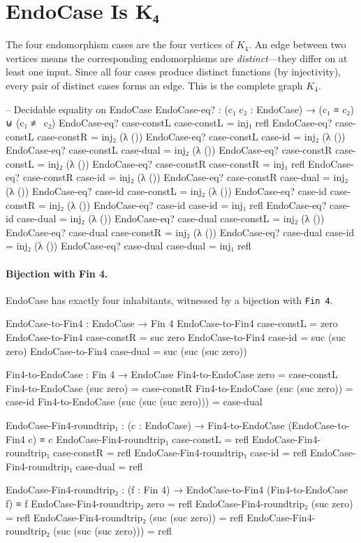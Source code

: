 \documentclass[11pt,a4paper]{book}
\begin{document}
\section{EndoCase Is K₄}
\label{sec:endocase-is-k4}

The four endomorphism cases are the four vertices of $K_4$. An edge between two
vertices means the corresponding endomorphisms are \emph{distinct}---they differ on
at least one input. Since all four cases produce distinct functions (by injectivity),
every pair of distinct cases forms an edge. This is the complete graph $K_4$.

\begin{code}
-- Decidable equality on EndoCase
EndoCase-eq? : (c₁ c₂ : EndoCase) → (c₁ ≡ c₂) ⊎ (c₁ ≢ c₂)
EndoCase-eq? case-constL case-constL = inj₁ refl
EndoCase-eq? case-constL case-constR = inj₂ (λ ())
EndoCase-eq? case-constL case-id     = inj₂ (λ ())
EndoCase-eq? case-constL case-dual   = inj₂ (λ ())
EndoCase-eq? case-constR case-constL = inj₂ (λ ())
EndoCase-eq? case-constR case-constR = inj₁ refl
EndoCase-eq? case-constR case-id     = inj₂ (λ ())
EndoCase-eq? case-constR case-dual   = inj₂ (λ ())
EndoCase-eq? case-id     case-constL = inj₂ (λ ())
EndoCase-eq? case-id     case-constR = inj₂ (λ ())
EndoCase-eq? case-id     case-id     = inj₁ refl
EndoCase-eq? case-id     case-dual   = inj₂ (λ ())
EndoCase-eq? case-dual   case-constL = inj₂ (λ ())
EndoCase-eq? case-dual   case-constR = inj₂ (λ ())
EndoCase-eq? case-dual   case-id     = inj₂ (λ ())
EndoCase-eq? case-dual   case-dual   = inj₁ refl
\end{code}

\paragraph{Bijection with Fin 4.}
EndoCase has exactly four inhabitants, witnessed by a bijection with \texttt{Fin 4}.

\begin{code}
EndoCase-to-Fin4 : EndoCase → Fin 4
EndoCase-to-Fin4 case-constL = zero
EndoCase-to-Fin4 case-constR = suc zero
EndoCase-to-Fin4 case-id     = suc (suc zero)
EndoCase-to-Fin4 case-dual   = suc (suc (suc zero))

Fin4-to-EndoCase : Fin 4 → EndoCase
Fin4-to-EndoCase zero                      = case-constL
Fin4-to-EndoCase (suc zero)                = case-constR
Fin4-to-EndoCase (suc (suc zero))          = case-id
Fin4-to-EndoCase (suc (suc (suc zero)))    = case-dual

EndoCase-Fin4-roundtrip₁ : (c : EndoCase) → Fin4-to-EndoCase (EndoCase-to-Fin4 c) ≡ c
EndoCase-Fin4-roundtrip₁ case-constL = refl
EndoCase-Fin4-roundtrip₁ case-constR = refl
EndoCase-Fin4-roundtrip₁ case-id     = refl
EndoCase-Fin4-roundtrip₁ case-dual   = refl

EndoCase-Fin4-roundtrip₂ : (f : Fin 4) → EndoCase-to-Fin4 (Fin4-to-EndoCase f) ≡ f
EndoCase-Fin4-roundtrip₂ zero                      = refl
EndoCase-Fin4-roundtrip₂ (suc zero)                = refl
EndoCase-Fin4-roundtrip₂ (suc (suc zero))          = refl
EndoCase-Fin4-roundtrip₂ (suc (suc (suc zero)))    = refl
\end{code}
\end{document}
